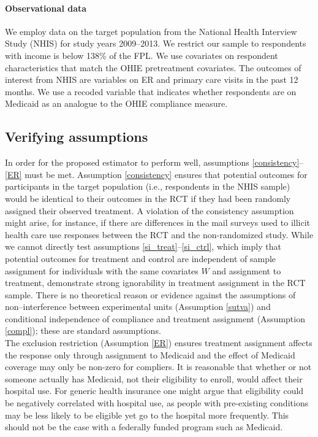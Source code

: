 \documentclass[12pt]{article}
\begin{document}
\paragraph{Observational data} 

We employ data on the target population from the National Health Interview Study (NHIS) \cite{NHIS} for study years 2009--2013.  We restrict our sample to respondents with income is below 138\% of the FPL. We use covariates on respondent characteristics that match the OHIE pretreatment covariates. The outcomes of interest from NHIS are variables on ER  and primary care visits in the past 12 months. We use a recoded variable that indicates whether respondents are on Medicaid as an analogue to the OHIE compliance measure.

\subsection{Verifying assumptions}

In order for the proposed estimator to perform well, assumptions \eqref{consistency}--\eqref{ER} must be met.  Assumption \eqref{consistency} ensures that potential outcomes for participants in the target population (i.e., respondents in the NHIS sample) would be identical to their outcomes in the RCT if they had been randomly assigned their observed treatment. A violation of the consistency assumption might arise, for instance, if there are differences in the mail surveys used to illicit health care use responses between the RCT and the non-randomized study. While we cannot directly test assumptions \eqref{si_treat}--\eqref{si_ctrl}, which imply that potential outcomes for treatment and control are independent of sample assignment for individuals with the same covariates $W$ and assignment to treatment, \citet{finkelstein2012} demonstrate strong ignorability in treatment assignment in the RCT sample. There is no theoretical reason or evidence against the assumptions of non--interference between experimental units (Assumption \ref{sutva}) and conditional independence of compliance and treatment assignment (Assumption \ref{compl}); these are standard assumptions. \\

The exclusion restriction (Assumption \ref{ER}) ensures treatment assignment affects the response only through assignment to Medicaid  and the effect of Medicaid coverage may only be non-zero for compliers. It is reasonable that whether or not someone actually has Medicaid, not their eligibility to enroll, would affect their hospital use.  For generic health insurance one might argue that eligibility could be negatively correlated with hospital use, as people with pre-existing conditions may be less likely to be eligible yet go to the hospital more frequently.  This should not be the case with a federally funded program such as Medicaid. \\
\end{document}

